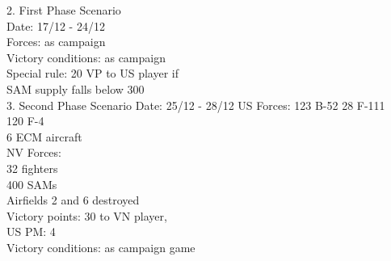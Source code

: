 2. First Phase Scenario\\
Date: 17/12 - 24/12\\
Forces: as campaign\\
Victory conditions: as campaign\\
Special rule: 20 VP to US player if\\
SAM supply falls below 300\\

3. Second Phase Scenario
Date: 25/12 - 28/12
US Forces:
123 B-52
28 F-111\\
120 F-4\\
6 ECM aircraft\\
NV Forces:\\
32 fighters\\
400 SAMs\\
Airfields 2 and 6 destroyed\\
Victory points: 30 to VN player,\\
US PM: 4\\
Victory conditions: as campaign game\\

